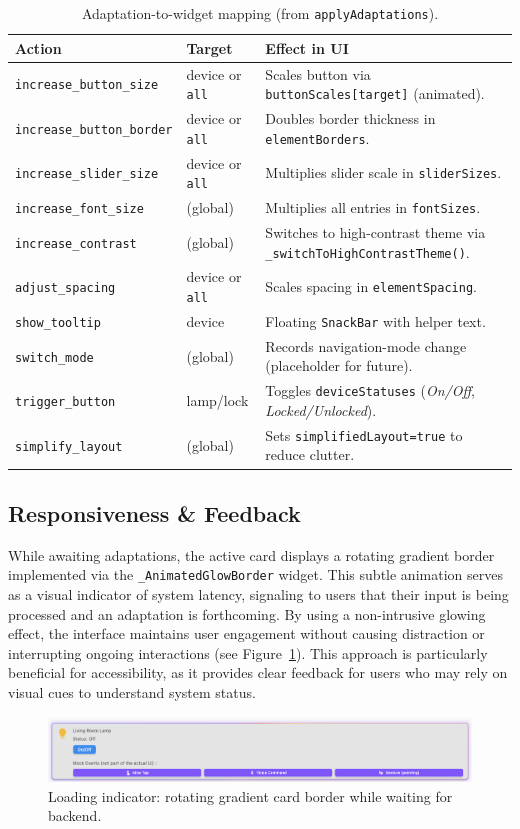 \begin{table}[H]
\centering
\caption{Adaptation-to-widget mapping (from \texttt{applyAdaptations}).}
\begin{tabular}{llp{7.8cm}}
\toprule
\textbf{Action} & \textbf{Target} & \textbf{Effect in UI} \\
\midrule
\texttt{increase\_button\_size} & device or \texttt{all} & Scales button via \texttt{buttonScales[target]} (animated). \\
\texttt{increase\_button\_border} & device or \texttt{all} & Doubles border thickness in \texttt{elementBorders}. \\
\texttt{increase\_slider\_size} & device or \texttt{all} & Multiplies slider scale in \texttt{sliderSizes}. \\
\texttt{increase\_font\_size} & (global) & Multiplies all entries in \texttt{fontSizes}. \\
\texttt{increase\_contrast} & (global) & Switches to high-contrast theme via \texttt{\_switchToHighContrastTheme()}. \\
\texttt{adjust\_spacing} & device or \texttt{all} & Scales spacing in \texttt{elementSpacing}. \\
\texttt{show\_tooltip} & device & Floating \texttt{SnackBar} with helper text. \\
\texttt{switch\_mode} & (global) & Records navigation-mode change (placeholder for future). \\
\texttt{trigger\_button} & lamp/lock & Toggles \texttt{deviceStatuses} (\emph{On/Off}, \emph{Locked/Unlocked}). \\
\texttt{simplify\_layout} & (global) & Sets \texttt{simplifiedLayout=true} to reduce clutter. \\
\bottomrule
\end{tabular}
\label{tab:frontend-adapt-mapping}
\end{table}

\subsection{Responsiveness \& Feedback}
While awaiting adaptations, the active card displays a rotating gradient border implemented via the \texttt{\_AnimatedGlowBorder} widget. This subtle animation serves as a visual indicator of system latency, signaling to users that their input is being processed and an adaptation is forthcoming. By using a non-intrusive glowing effect, the interface maintains user engagement without causing distraction or interrupting ongoing interactions (see Figure~\ref{fig:glow}). This approach is particularly beneficial for accessibility, as it provides clear feedback for users who may rely on visual cues to understand system status.
\begin{figure}[H]
\centering
\includegraphics[width=1\linewidth]{images/fig_glow_border.png}
\caption{Loading indicator: rotating gradient card border while waiting for backend.}
\label{fig:glow}
\end{figure}


